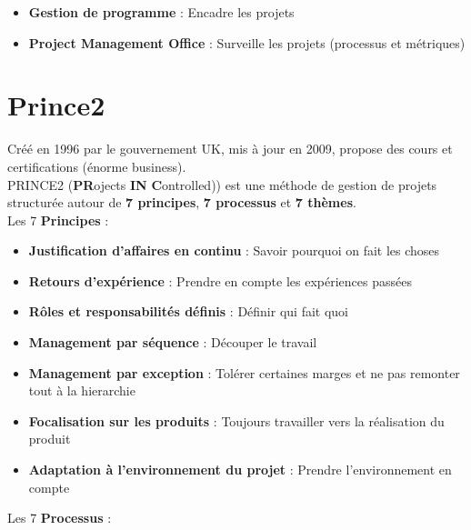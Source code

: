 \documentclass{report}
\begin{document}
		\begin{itemize}
			\item \textbf{Gestion de programme} : Encadre les projets
			\item \textbf{Project Management Office} : Surveille les projets (processus et métriques)
		\end{itemize}

	\section{Prince2}

		Créé en 1996 par le gouvernement UK, mis à jour en 2009, propose des cours et certifications (énorme business).\\

		PRINCE2 (\textbf{PR}ojects \textbf{IN} \textbf{C}ontrolled)) est une méthode de gestion de projets structurée autour de \textbf{7 principes}, \textbf{7 processus} et \textbf{7 thèmes}.\\

		Les 7 \textbf{Principes} : \\

		\begin{itemize}
			\item \textbf{Justification d'affaires en continu} : Savoir pourquoi on fait les choses
			\item \textbf{Retours d'expérience} : Prendre en compte les expériences passées
			\item \textbf{Rôles et responsabilités définis} : Définir qui fait quoi
			\item \textbf{Management par séquence} : Découper le travail
			\item \textbf{Management par exception} : Tolérer certaines marges et ne pas remonter tout à la hierarchie
			\item \textbf{Focalisation sur les produits} : Toujours travailler vers la réalisation du produit
			\item \textbf{Adaptation à l'environnement du projet} : Prendre l'environnement en compte
		\end{itemize}

		Les 7 \textbf{Processus} : \\
		
\end{document}
